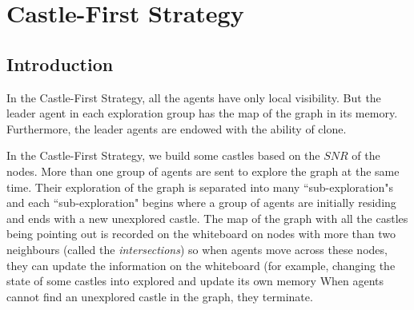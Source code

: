 

               
\section{Castle-First Strategy}
\subsection{ Introduction}
In the Castle-First Strategy, all the agents have only   local visibility. But the leader agent in each exploration group has the map of the graph in its memory. Furthermore, the leader agents are endowed with the ability of clone.

In the Castle-First Strategy, we build some castles based on the  $SNR$ of the nodes. More than one group of agents are sent to explore the graph at the same time. Their exploration of the graph is separated into many ``sub-exploration"s and each ``sub-exploration" begins   where a group of  agents are  initially residing  and ends with a new unexplored castle. The map of the graph with all the castles 
being pointing out is recorded on the whiteboard on nodes with more than two neighbours (called the {\em intersections}) so when agents move across these nodes, they can update the information on the whiteboard (for example, changing the state of some castles into explored and update its own memory %
When agents cannot find an unexplored castle in the graph,  they terminate. 

